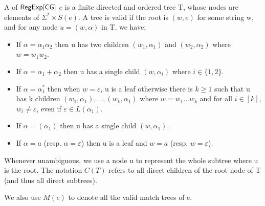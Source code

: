   
  \begin{definition}
  	A  of ${\sf RegExp}[\sf CG]$ $e$ is a finite directed and ordered
  	tree T, whose nodes are elements of $\Sigma^{\ast} \times S (e)$. A tree
  	is valid if the root is $(w, e)$ for some string w, and for any node $u =
  	(w, \alpha)$ in T, we have:
  	\begin{itemize}
  		\item If $\alpha = \alpha_1 \alpha_2$ then u has two children $(w_1,
  		\alpha_1)$ and $(w_2, \alpha_2)$ where $w = w_1 w_2$.
  		
  		\item If $\alpha = \alpha_1 + \alpha_2$ then u has a single child $(w,
  		\alpha_i)$ where $i \in \{ 1, 2 \}$.
  		
  		\item If $\alpha = \alpha_1^{\ast}$ then when $w = \varepsilon$, u is a
  		leaf otherwise there is $k \geqslant 1$ such that u has k children $(w_1,
  		\alpha_1), \ldots, (w_k, \alpha_1)$ where $w = w_1 \ldots w_k$ and for all
  		$i \in [k]$, $w_i \neq \varepsilon$, even if $\varepsilon \in L
  		(\alpha_1)$.
  		
  		\item If $\alpha = (\alpha_1)$ then u has a single child $(w, \alpha_1)$.
  		
  		\item If $\alpha = a$ (resp. $\alpha = \varepsilon$) then u is a leaf and
  		$w = a$ (resp. $w = \varepsilon$).
  	\end{itemize}
  	
  	Whenever unambiguous, we use a node u to represent the whole subtree
  	where u is the root. The notation $C(T)$ refers to all direct children of the root node of T
  	(and thus all direct subtrees).
  	
  	We also use $M (e)$ to denote all the valid match trees of e.
  \end{definition}
  
